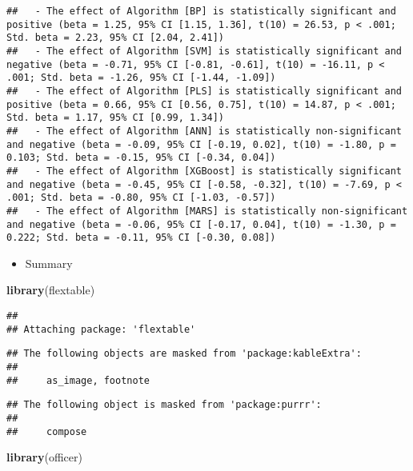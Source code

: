 \documentclass[
]{article}
\newenvironment{Shaded}{\begin{snugshade}}{\end{snugshade}}
\newcommand{\FunctionTok}[1]{\textcolor[rgb]{0.13,0.29,0.53}{\textbf{#1}}}
\newcommand{\NormalTok}[1]{#1}
\providecommand{\tightlist}{%
  \setlength{\itemsep}{0pt}\setlength{\parskip}{0pt}}
\begin{document}
\begin{verbatim}
##   - The effect of Algorithm [BP] is statistically significant and positive (beta = 1.25, 95% CI [1.15, 1.36], t(10) = 26.53, p < .001; Std. beta = 2.23, 95% CI [2.04, 2.41])
##   - The effect of Algorithm [SVM] is statistically significant and negative (beta = -0.71, 95% CI [-0.81, -0.61], t(10) = -16.11, p < .001; Std. beta = -1.26, 95% CI [-1.44, -1.09])
##   - The effect of Algorithm [PLS] is statistically significant and positive (beta = 0.66, 95% CI [0.56, 0.75], t(10) = 14.87, p < .001; Std. beta = 1.17, 95% CI [0.99, 1.34])
##   - The effect of Algorithm [ANN] is statistically non-significant and negative (beta = -0.09, 95% CI [-0.19, 0.02], t(10) = -1.80, p = 0.103; Std. beta = -0.15, 95% CI [-0.34, 0.04])
##   - The effect of Algorithm [XGBoost] is statistically significant and negative (beta = -0.45, 95% CI [-0.58, -0.32], t(10) = -7.69, p < .001; Std. beta = -0.80, 95% CI [-1.03, -0.57])
##   - The effect of Algorithm [MARS] is statistically non-significant and negative (beta = -0.06, 95% CI [-0.17, 0.04], t(10) = -1.30, p = 0.222; Std. beta = -0.11, 95% CI [-0.30, 0.08])
\end{verbatim}

\begin{itemize}
\tightlist
\item
  Summary
\end{itemize}

\begin{Shaded}
\begin{Highlighting}[]
\FunctionTok{library}\NormalTok{(flextable)}
\end{Highlighting}
\end{Shaded}

\begin{verbatim}
## 
## Attaching package: 'flextable'
\end{verbatim}

\begin{verbatim}
## The following objects are masked from 'package:kableExtra':
## 
##     as_image, footnote
\end{verbatim}

\begin{verbatim}
## The following object is masked from 'package:purrr':
## 
##     compose
\end{verbatim}

\begin{Shaded}
\begin{Highlighting}[]
\FunctionTok{library}\NormalTok{(officer)}
\end{Highlighting}
\end{Shaded}
\end{document}
